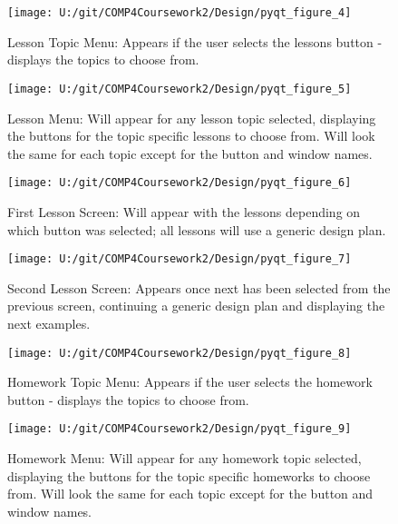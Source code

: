 \begin{figure}[H]
    \label{fig:print_function_result}\caption{Lesson Topic Menu: Appears if the user selects the lessons button - displays the topics to choose from.}
    \texttt{[image: U:/git/COMP4Coursework2/Design/pyqt\_figure\_4]}
\end{figure}

\begin{figure}[H]
    \label{fig:print_function_result}\caption{Lesson Menu: Will appear for any lesson topic selected, displaying the buttons for the topic specific lessons to choose from. Will look the same for each topic except for the button and window names.}
    \texttt{[image: U:/git/COMP4Coursework2/Design/pyqt\_figure\_5]}
\end{figure}

\begin{figure}[H]
    \label{fig:print_function_result}\caption{First Lesson Screen: Will appear with the lessons depending on which button was selected; all lessons will use a generic design plan.}
    \texttt{[image: U:/git/COMP4Coursework2/Design/pyqt\_figure\_6]}
\end{figure}

\begin{figure}[H]
    \label{fig:print_function_result}\caption{Second Lesson Screen: Appears once next has been selected from the previous screen, continuing a generic design plan and displaying the next examples.}
    \texttt{[image: U:/git/COMP4Coursework2/Design/pyqt\_figure\_7]}
\end{figure}

\begin{figure}[H]
    \label{fig:print_function_result}\caption{Homework Topic Menu: Appears if the user selects the homework button - displays the topics to choose from.}
    \texttt{[image: U:/git/COMP4Coursework2/Design/pyqt\_figure\_8]}
\end{figure}

\begin{figure}[H]
    \label{fig:print_function_result}\caption{Homework Menu: Will appear for any homework topic selected, displaying the buttons for the topic specific homeworks to choose from. Will look the same for each topic except for the button and window names.}
    \texttt{[image: U:/git/COMP4Coursework2/Design/pyqt\_figure\_9]}
\end{figure}

